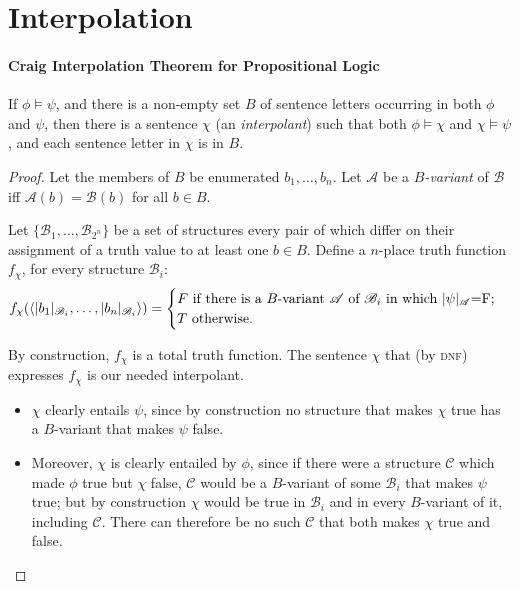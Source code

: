 \section{Interpolation}


\paragraph{Craig Interpolation Theorem for Propositional Logic}

\begin{theorem}\label{thmcraig}If $\phi 
\vDash \psi$, and there is a non-empty set $B$ of sentence letters occurring in both $\phi$ and
$\psi$, then there is a sentence $\chi$ (an \emph{interpolant}) such that both $\phi \vDash \chi$ and
$\chi \vDash \psi$, and each sentence letter in $\chi$ is in $B$. \end{theorem}
\begin{proof} Let the members of $B$ be enumerated $b_{1},\ldots,b_{n}$.
Let $\mathscr{A}$ be a \emph{$B$-variant} of $\mathscr{B}$ iff $\mathscr{A}(b)=\mathscr{B}(b)$ for all $b\in B$. 

 Let $\{\mathscr{B}_{1},\ldots,\mathscr{B}_{2^{n}}\}$ be a set of structures every pair of which differ on their assignment of a truth value to at least one $b \in B$. Define a $n$-place truth function $f_{\chi}$, for every structure $\mathscr{B}_{i}$: \[f_{\chi}(\langle\val{b_{1}}{B_{\mathnormal i}},\ldots,\val{b_{n}}{B_{\mathnormal i}}\rangle) = \begin{cases} F \text{ if there is a $B$-variant $\mathscr{A}$ of $\mathscr{B}_{i}$ in which } $\val{\psi}{A}=F$;\\
T \text{ otherwise.}\end{cases}\]

 By construction, $f_{\chi}$ is a total truth function. 
The sentence $\chi$ that (by \textsc{\lowercase{DNF}}) expresses $f_{\chi}$ is our needed interpolant.
\begin{itemize}
	\item $\chi$ clearly 
	entails $\psi$, since by construction no structure that makes $\chi$ true has a $B$-variant that makes $\psi$ false.
	\item  Moreover, $\chi$ is clearly entailed by $\phi$,
	since if there were a structure $\mathscr{C}$ which made $\phi$ true but $\chi$
	false,  $\mathscr{C}$ would be a $B$-variant of some $\mathscr{B}_{i}$ that makes
	$\psi$ true; but by construction $\chi$ would be true in $\mathscr{B}_{i}$
	and in every $B$-variant of it, including  $\mathscr{C}$. There can
	therefore be no such  $\mathscr{C}$ that both makes $\chi$ true and false.
\end{itemize}  \end{proof}

